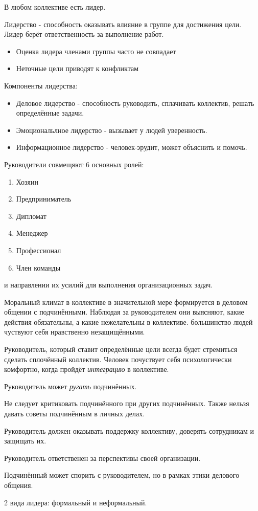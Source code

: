 В любом коллективе есть лидер.

Лидерство - способность оказывать влияние в группе для достижения цели. Лидер берёт ответственность за выполнение работ.

\begin{itemize}
    \item Оценка лидера членами группы часто не совпадает
    \item Неточные цели приводят к конфликтам
\end{itemize}

Компоненты лидерства:
\begin{itemize}
    \item Деловое лидерство - способность руководить, сплачивать коллектив, решать определённые задачи.
    \item Эмоциональлное лидерство - вызывает у людей уверенность.
    \item Информационное лидерство - человек-эрудит, может объяснить и помочь.
\end{itemize}

Руководители совмещяют 6 основных ролей:
\begin{enumerate}
    \item Хозяин
    \item Предприниматель
    \item Дипломат
    \item Менеджер
    \item Профессионал
    \item Член команды
\end{enumerate}

\missed{} и направлении их усилий для выполнения организационных задач.

Моральный климат в коллективе в значительной мере формируется в деловом общении с подчинёнными. Наблюдая за руководителем они выясняют, какие действия обязательны, а какие нежелательны в коллективе.
\missed{} большинство людей чуствуют себя нравственно незащищёнными.

Руководитель, который ставит определённые цели всегда будет стремиться сделать сплочённый коллектив. Человек почуствует себя психологически комфортно, когда пройдёт \textit{интеграцию} в коллективе.

Руководитель может \textit{ругать} подчинённых.

Не следует критиковать подчинённого при других подчинённых. Также нельзя давать советы подчинённым в личных делах.

Руководитель должен оказывать поддержку коллективу, доверять сотрудникам и защищать их.

Руководитель ответственен за перспективы своей организации.

Подчинённый может спорить с руководителем, но в рамках этики делового общения.

2 вида лидера: формальный и неформальный.

